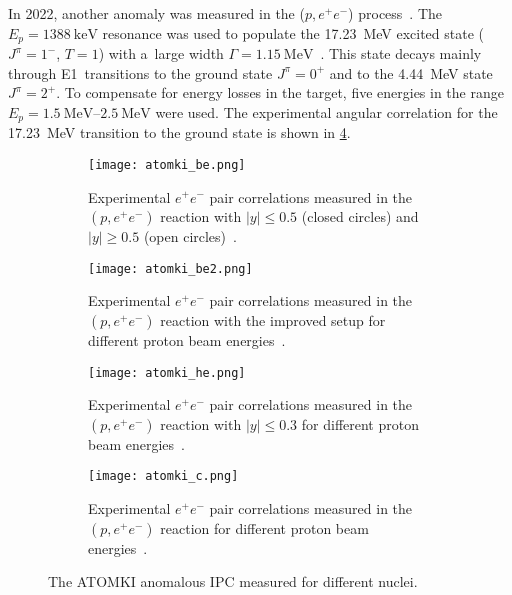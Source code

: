 			In 2022, another anomaly was measured in the ($p,e^+e^-$) process~\cite{atomki_c}. The $E_p = \qty{1388}{\keV}$ resonance was used to populate the \qty{17.23}{\MeV} excited state ($J^\pi = 1^-$, $T = 1$) with a~large width $\Gamma = \qty{1.15}{\MeV}$~\cite{resonances3}. This state decays mainly through E1~transitions to the ground state $J^\pi = 0^+$ and to the \qty{4.44}{\MeV} state $J^\pi = 2^+$. To compensate for energy losses in the target, five energies in the range $E_p = \qtyrange{1.5}{2.5}{\MeV}$ were used. The experimental angular correlation for the \qty{17.23}{\MeV} transition to the ground state is shown in \cref{fig:atomki_c}.
			
				\begin{figure}
					\centering
					\begin{subfigure}[t]{0.48\textwidth}
						\centering
						\texttt{[image: atomki\_be.png]}
						\caption{Experimental $e^+e^-$ pair correlations measured in the $(p,e^+e^-)$ reaction with $|y| \leq 0.5$ (closed circles) and $|y| \geq 0.5$ (open circles)~\cite{atomki_be}.}
						\label{fig:atomki_be}
					\end{subfigure}
					\hfill
					\begin{subfigure}[t]{0.42\textwidth}
						\centering
						\texttt{[image: atomki\_be2.png]}
						\caption{Experimental $e^+e^-$ pair correlations measured in the $(p,e^+e^-)$ reaction with the improved setup for different proton beam energies~\cite{atomki_be2}.}
						\label{fig:atomki_be2}
					\end{subfigure}
					\begin{subfigure}[t]{0.45\textwidth}
						\centering
						\texttt{[image: atomki\_he.png]}
						\caption{Experimental $e^+e^-$ pair correlations measured in the $(p,e^+e^-)$ reaction with $|y| \leq 0.3$ for different proton beam energies~\cite{atomki_he2}.}
						\label{fig:atomki_he}
					\end{subfigure}
					\hfill
					\begin{subfigure}[t]{0.45\textwidth}
						\centering
						\texttt{[image: atomki\_c.png]}
						\caption{Experimental $e^+e^-$ pair correlations measured in the $(p,e^+e^-)$ reaction for different proton beam energies~\cite{atomki_c}.}
						\label{fig:atomki_c}
					\end{subfigure}
					\caption{The ATOMKI anomalous \ac{IPC} measured for different nuclei.}
					\label{fig:atomki}
				\end{figure}
			
